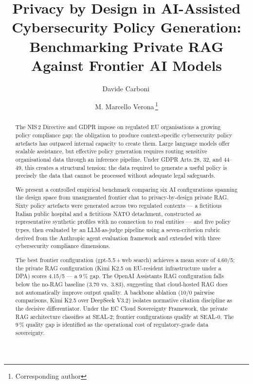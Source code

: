 \documentclass[runningheads]{llncs}
\renewcommand{\orcidID}[1]{\,\orcidlink{#1}}
\begin{document}
\title{Privacy by Design in AI-Assisted Cybersecurity Policy
Generation: Benchmarking Private RAG Against Frontier AI Models}


\author{Davide Carboni\orcidID{0009-0000-7104-3639} \and
M. Marcello Verona\orcidID{0009-0004-4428-5332}\thanks{Corresponding author}}

\maketitle

\begin{abstract}
The NIS\,2 Directive and GDPR impose on regulated EU organisations a
growing policy compliance gap: the obligation to produce context-specific
cybersecurity policy artefacts has outpaced internal capacity to create
them. Large language models offer scalable assistance, but effective policy
generation requires routing sensitive organisational data through an
inference pipeline. Under GDPR Arts.\,28, 32, and 44--49, this creates a
structural tension: the data required to generate a useful policy is
precisely the data that cannot be processed without adequate legal
safeguards.

We present a controlled empirical benchmark comparing six AI configurations
spanning the design space from unaugmented frontier chat to privacy-by-design
private RAG. Sixty policy artefacts were generated across two regulated
contexts --- a fictitious Italian public hospital and a fictitious NATO
detachment, constructed as representative synthetic profiles with no
connection to real entities --- and five policy types, then evaluated by an
LLM-as-judge pipeline using a seven-criterion rubric derived from the
Anthropic agent evaluation framework and extended with three cybersecurity
compliance dimensions.

The best frontier configuration (gpt-5.5\,+\,web search) achieves a mean
score of 4.60/5; the private RAG configuration (Kimi K2.5 on EU-resident
infrastructure under a DPA) scores 4.15/5 --- a 9\,\% gap. The OpenAI
Assistants RAG configuration falls below the no-RAG baseline (3.70
vs.\ 3.83), suggesting that cloud-hosted RAG does not automatically improve
output quality. A backbone ablation (10/0 pairwise comparisons, Kimi K2.5
over DeepSeek V3.2) isolates normative citation discipline as the decisive
differentiator. Under the EC Cloud Sovereignty Framework, the private RAG
architecture classifies at SEAL-2; frontier configurations qualify at
SEAL-0. The 9\,\% quality gap is identified as the operational cost of
regulatory-grade data sovereignty.
\end{abstract}
\end{document}
